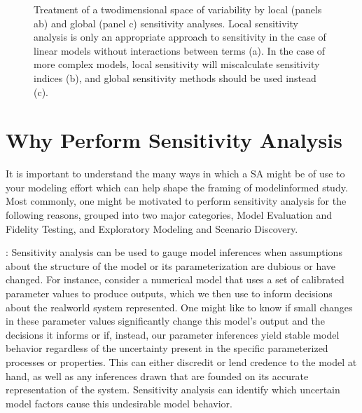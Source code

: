 \documentclass[letterpaper,10pt,english]{sphinxmanual}
\let\sphinxpxdimen\pdfpxdimen\else\newdimen\sphinxpxdimen
\begin{document}
\begin{figure}[htbp]
\centering
\capstart

\noindent\sphinxincludegraphics[width=700\sphinxpxdimen]{{figure3_global_versus_local}.png}
\caption{Treatment of a two\sphinxhyphen{}dimensional space of variability by local (panels a\sphinxhyphen{}b) and global (panel c) sensitivity analyses. Local sensitivity analysis is only an appropriate approach to sensitivity in the case of linear models without interactions between terms (a). In the case of more complex models, local sensitivity will miscalculate sensitivity indices (b), and global sensitivity methods should be used instead (c).}\label{\detokenize{3_sensitivity_analysis_the_basics:id1}}\end{figure}


\section{Why Perform Sensitivity Analysis}
\label{\detokenize{3_sensitivity_analysis_the_basics:why-perform-sensitivity-analysis}}
\sphinxAtStartPar
It is important to understand the many ways in which a SA might be of use to your modeling effort which can help shape the framing of model\sphinxhyphen{}informed study. Most commonly, one might be motivated to perform sensitivity analysis for the following reasons, grouped into two major categories, Model Evaluation and Fidelity Testing, and Exploratory Modeling and Scenario Discovery.

\sphinxAtStartPar
{}: Sensitivity analysis can be used to gauge model inferences when assumptions about the structure of the model or its parameterization are dubious or have changed. For instance, consider a numerical model that uses a set of calibrated parameter values to produce outputs, which we then use to inform decisions about the real\sphinxhyphen{}world system represented. One might like to know if small changes in these parameter values significantly change this model’s output and the decisions it informs or if, instead, our parameter inferences yield stable model behavior regardless of the uncertainty present in the specific parameterized processes or properties. This can either discredit or lend credence to the model at hand, as well as any inferences drawn that are founded on its accurate representation of the system. Sensitivity analysis can identify which uncertain model factors cause this undesirable model behavior.
\end{document}
